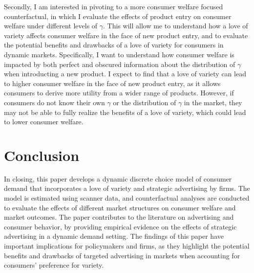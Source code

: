 \documentclass[12pt]{article}
\begin{document}
    Secondly, I am interested in pivoting to a more consumer welfare focused counterfactual, in which I evaluate the effects of product entry on consumer welfare under different levels of $\gamma$. This will allow me to understand how a love of variety affects consumer welfare in the face of new product entry, and to evaluate the potential benefits and drawbacks of a love of variety for consumers in dynamic markets. Specifically, I want to understand how consumer welfare is impacted by both perfect and obscured information about the distribution of $\gamma$ when introducting a new product. I expect to find that a love of variety can lead to higher consumer welfare in the face of new product entry, as it allows consumers to derive more utility from a wider range of products. However, if consumers do not know their own $\gamma$ or the distribution of $\gamma$ in the market, they may not be able to fully realize the benefits of a love of variety, which could lead to lower consumer welfare.


\section{Conclusion}

In closing, this paper develops a dynamic discrete choice model of consumer demand that incorporates a love of variety and strategic advertising by firms. The model is estimated using scanner data, and counterfactual analyses are conducted to evaluate the effects of different market structures on consumer welfare and market outcomes. The paper contributes to the literature on  advertising and consumer behavior, by providing empirical evidence on the effects of strategic advertising in a dynamic demand setting. The findings of this paper have important implications for policymakers and firms, as they highlight the potential benefits and drawbacks of targeted advertising in markets when accounting for consumers' preference for variety.

\newpage


\end{document}

